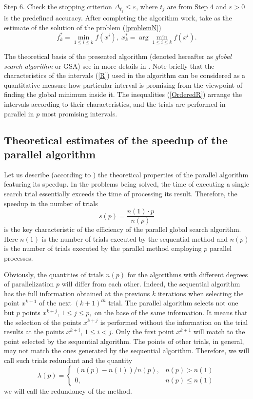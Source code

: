\documentclass[runningheads]{llncs}
\begin{document}
Step 6. Check the stopping criterion $\Delta_{t_j} \leq \varepsilon$, where $t_j$ are from Step 4 and $\varepsilon > 0$ is the predefined accuracy. 
After completing the algorithm work, take as the estimate of the solution of the problem (\ref{problemN})
$$ f_k^* = \min\limits_{1 \leq i \leq k} f(x^i), \; x_k^* = \arg \min\limits_{1 \leq i \leq k} f(x^i).$$

The theoretical basis of the presented algorithm (denoted hereafter as \textit{global search algorithm} or GSA) see in more details in \cite{Strongin2000,Strongin2018}. Note briefly that the characteristics of the intervals (\ref{R}) used in the algorithm can be considered as a quantitative measure how particular interval is promising from the viewpoint of finding the global minimum inside it. The inequalities (\ref{OrderedR}) arrange the intervals according to their characteristics, and the trials are performed in parallel in $p$ most promising intervals.

\subsection{Theoretical estimates of the speedup of the parallel algorithm}

Let us describe (according to \cite{Strongin2000}) the theoretical properties of the parallel algorithm featuring its speedup. In the problems being solved, the time of executing a single search trial essentially exceeds the time of processing its result. Therefore, the speedup in the number of trials 
\begin{equation} \label{par_trl_ref}
s(p) = \frac{n(1) \cdot p}{n(p)}
\end{equation}
is the key characteristic of the efficiency of the parallel global search algorithm.
Here $n(1)$ is the number of trials executed by the sequential method and $n(p)$ is the number of trials executed by the parallel method employing $p$ parallel processes.

Obviously, the quantities of trials $n(p)$ for the algorithms with different degrees of parallelization $p$ will differ from each other. Indeed, the sequential algorithm has the full information obtained at the previous $k$ iterations when selecting the point $x^{k+1}$ of the next $(k+1)^{th}$ trial. The parallel algorithm selects not one but $p$ points $x^{k+j}$, $1 \leq j \leq p,$ on the base of the same information. It means that the selection of the points $x^{k+j}$ is performed without the information on the trial results at the points $x^{k+i}$, $1 \leq i < j$. Only the first point $x^{k+1}$ will match to the point selected by the sequential algorithm. The points of other trials, in general, may not match the ones generated by the sequential algorithm. Therefore, we will call such trials redundant and the quantity
\begin{displaymath}
\lambda(p) = \left\{ \begin{array}{ll}
                (n(p) - n(1)) / n(p), & \textrm{$n(p) > n(1)$}\\
                0, & \textrm{$n(p) \leq n(1)$}
  \end{array} \right.
\end{displaymath}
we will call the redundancy of the method.
\end{document}
